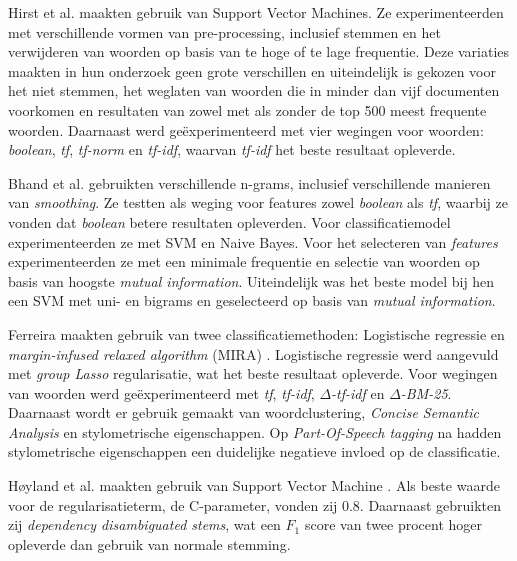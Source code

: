 Hirst et al. \cite{Hirst_textto} maakten  gebruik van Support Vector Machines. Ze experimenteerden met verschillende vormen van pre-processing, inclusief stemmen en het verwijderen van woorden op basis van te hoge of te lage frequentie. Deze variaties maakten in hun onderzoek geen grote verschillen en uiteindelijk is gekozen voor het niet stemmen, het weglaten van woorden die in minder dan vijf documenten voorkomen en resultaten van zowel met als zonder de top 500 meest frequente woorden. Daarnaast werd geëxperimenteerd met vier wegingen voor woorden: \textit{boolean}, \textit{tf}, \textit{tf-norm} en \textit{tf-idf}, waarvan \textit{tf-idf} het beste resultaat opleverde. \par

Bhand et al. \cite{bhand} gebruikten verschillende n-grams, inclusief verschillende manieren van \textit{smoothing}. Ze testten als weging voor features zowel \textit{boolean} als \textit{tf}, waarbij ze vonden dat \textit{boolean} betere resultaten opleverden. Voor classificatiemodel experimenteerden ze met SVM en Naive Bayes. Voor het selecteren van \textit{features} experimenteerden ze met een minimale frequentie en selectie van woorden op basis van hoogste \textit{mutual information}. Uiteindelijk was het beste model bij hen een SVM met uni- en bigrams en geselecteerd op basis van \textit{mutual information}.\par

Ferreira maakten gebruik van twee classificatiemethoden: Logistische regressie en \textit{margin-infused relaxed algorithm} (MIRA) \cite{Ferreira2016UsingTT}. Logistische regressie werd aangevuld met \textit{group Lasso} regularisatie, wat het beste resultaat opleverde. Voor wegingen van woorden werd geëxperimenteerd met \textit{tf}, \textit{tf-idf}, \textit{$\Delta$-tf-idf} en \textit{$\Delta$-BM-25}. Daarnaast wordt er gebruik gemaakt van woordclustering, \textit{Concise Semantic Analysis} en stylometrische eigenschappen. Op \textit{Part-Of-Speech tagging} na hadden stylometrische eigenschappen een duidelijke negatieve invloed op de classificatie.\par
Høyland et al. maakten gebruik van Support Vector Machine \cite{W14-2516}. Als beste waarde voor de regularisatieterm, de C-parameter, vonden zij 0.8. Daarnaast gebruikten zij \textit{dependency disambiguated
stems}, wat een $F_1$ score van twee procent hoger opleverde dan gebruik van normale stemming.\par

